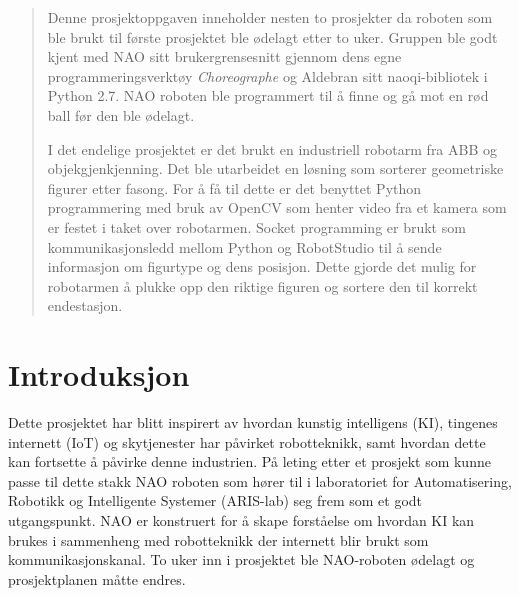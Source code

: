 \documentclass[conference]{IEEEtran}
\begin{document}
\maketitle

\begin{abstract}
    Denne prosjektoppgaven inneholder nesten to prosjekter da roboten som ble brukt til første prosjektet ble ødelagt etter to uker. 
    Gruppen ble godt kjent med NAO sitt brukergrensesnitt gjennom dens egne programmeringsverktøy \textit{Choreographe} og Aldebran sitt 
    naoqi-bibliotek i Python 2.7. NAO roboten ble programmert til å finne og gå mot en rød ball før den ble ødelagt. 

    I det endelige prosjektet er det brukt en industriell robotarm fra ABB og objekgjenkjenning. 
    Det ble utarbeidet en løsning som sorterer geometriske figurer etter fasong. For å få til dette 
    er det benyttet Python programmering med bruk av OpenCV som henter video fra et kamera som er 
    festet i taket over robotarmen. Socket programming er brukt som kommunikasjonsledd mellom Python 
    og RobotStudio til å sende informasjon om figurtype og dens posisjon. Dette gjorde det mulig for 
    robotarmen å plukke opp den riktige figuren og sortere den til korrekt endestasjon. 
\end{abstract}





%
\IEEEpeerreviewmaketitle



\section{Introduksjon}
Dette prosjektet har blitt inspirert av hvordan kunstig intelligens (KI), tingenes internett (IoT) og skytjenester har påvirket robotteknikk, 
samt hvordan dette kan fortsette å påvirke denne industrien. På leting etter et prosjekt som kunne passe til dette stakk NAO roboten som hører
til i laboratoriet for Automatisering, Robotikk og Intelligente Systemer (ARIS-lab) seg frem som et godt utgangspunkt. NAO er konstruert for å 
skape forståelse om hvordan KI kan brukes i sammenheng med robotteknikk der internett blir brukt som kommunikasjonskanal. To uker inn i prosjektet 
ble NAO-roboten ødelagt og prosjektplanen måtte endres. 
\end{document}
